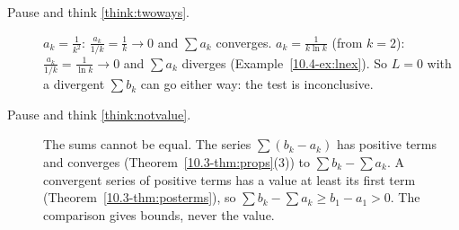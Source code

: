 \documentclass[11pt]{article}
\begin{document}
\begin{description}
  \item[Pause and think \ref{think:twoways}.] $a_k=\frac1{k^2}$: $\frac{a_k}{1/k}=\frac1k\to0$ and $\sum a_k$ converges. $a_k=\frac1{k\ln k}$ (from $k=2$): $\frac{a_k}{1/k}=\frac1{\ln k}\to0$ and $\sum a_k$ diverges (Example~\ref{10.4-ex:lnex}). So $L=0$ with a divergent $\sum b_k$ can go either way: the test is inconclusive.
  \item[Pause and think \ref{think:notvalue}.] The sums cannot be equal. The series $\sum(b_k-a_k)$ has positive terms and converges (Theorem~\ref{10.3-thm:props}(3)) to $\sum b_k-\sum a_k$. A convergent series of positive terms has a value at least its first term (Theorem~\ref{10.3-thm:posterms}), so $\sum b_k-\sum a_k\ge b_1-a_1>0$. The comparison gives bounds, never the value.
\end{description}
\end{document}
